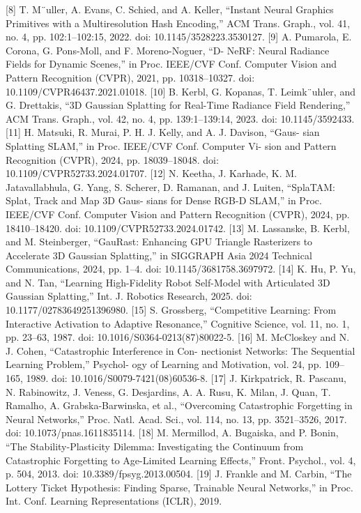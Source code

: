 \documentclass[10pt,twocolumn,letterpaper]{article}
\begin{document}
[8] T. M¨uller, A. Evans, C. Schied, and A. Keller, “Instant Neural Graphics Primitives with a Multiresolution Hash Encoding,” ACM Trans. Graph., vol. 41, no. 4, pp. 102:1–102:15, 2022. doi: 10.1145/3528223.3530127. [9] A. Pumarola, E. Corona, G. Pons-Moll, and F. Moreno-Noguer, “D- NeRF: Neural Radiance Fields for Dynamic Scenes,” in Proc. IEEE/CVF Conf. Computer Vision and Pattern Recognition (CVPR), 2021, pp. 10318–10327. doi: 10.1109/CVPR46437.2021.01018. [10] B. Kerbl, G. Kopanas, T. Leimk¨uhler, and G. Drettakis, “3D Gaussian Splatting for Real-Time Radiance Field Rendering,” ACM Trans. Graph., vol. 42, no. 4, pp. 139:1–139:14, 2023. doi: 10.1145/3592433. [11] H. Matsuki, R. Murai, P. H. J. Kelly, and A. J. Davison, “Gaus- sian Splatting SLAM,” in Proc. IEEE/CVF Conf. Computer Vi- sion and Pattern Recognition (CVPR), 2024, pp. 18039–18048. doi: 10.1109/CVPR52733.2024.01707. [12] N. Keetha, J. Karhade, K. M. Jatavallabhula, G. Yang, S. Scherer, D. Ramanan, and J. Luiten, “SplaTAM: Splat, Track and Map 3D Gaus- sians for Dense RGB-D SLAM,” in Proc. IEEE/CVF Conf. Computer Vision and Pattern Recognition (CVPR), 2024, pp. 18410–18420. doi: 10.1109/CVPR52733.2024.01742. [13] M. Lassanske, B. Kerbl, and M. Steinberger, “GauRast: Enhancing GPU Triangle Rasterizers to Accelerate 3D Gaussian Splatting,” in SIGGRAPH Asia 2024 Technical Communications, 2024, pp. 1–4. doi: 10.1145/3681758.3697972. [14] K. Hu, P. Yu, and N. Tan, “Learning High-Fidelity Robot Self-Model with Articulated 3D Gaussian Splatting,” Int. J. Robotics Research, 2025. doi: 10.1177/02783649251396980. [15] S. Grossberg, “Competitive Learning: From Interactive Activation to Adaptive Resonance,” Cognitive Science, vol. 11, no. 1, pp. 23–63, 1987. doi: 10.1016/S0364-0213(87)80022-5. [16] M. McCloskey and N. J. Cohen, “Catastrophic Interference in Con- nectionist Networks: The Sequential Learning Problem,” Psychol- ogy of Learning and Motivation, vol. 24, pp. 109–165, 1989. doi: 10.1016/S0079-7421(08)60536-8. [17] J. Kirkpatrick, R. Pascanu, N. Rabinowitz, J. Veness, G. Desjardins, A. A. Rusu, K. Milan, J. Quan, T. Ramalho, A. Grabska-Barwinska, et al., “Overcoming Catastrophic Forgetting in Neural Networks,” Proc. Natl. Acad. Sci., vol. 114, no. 13, pp. 3521–3526, 2017. doi: 10.1073/pnas.1611835114. [18] M. Mermillod, A. Bugaiska, and P. Bonin, “The Stability-Plasticity Dilemma: Investigating the Continuum from Catastrophic Forgetting to Age-Limited Learning Effects,” Front. Psychol., vol. 4, p. 504, 2013. doi: 10.3389/fpsyg.2013.00504. [19] J. Frankle and M. Carbin, “The Lottery Ticket Hypothesis: Finding Sparse, Trainable Neural Networks,” in Proc. Int. Conf. Learning Representations (ICLR), 2019.
\end{document}

